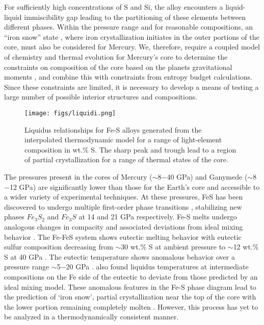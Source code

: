 For sufficiently high concentrations of S and Si, the alloy encounters a
liquid-liquid immiscibility gap leading to the partitioning of these elements between
different phases. Within the pressure range and for reasonable compositions, an “iron
snow” state \citep{Chen2008,Williams2009}, where iron crystallization initiates in
the outer portions of the core, must also be considered for Mercury. We, therefore,
require a coupled model of chemistry and thermal evolution for Mercury's core to
determine the constraints on composition of the core based on the planets
gravitational moments \citep{Smith2012}, and combine this with constraints from
entropy budget calculations.  Since these constraints are limited, it is necessary to
develop a means of testing a large number of possible interior structures and
compositions.

 \begin{figure}[h] %
   \centering
   \texttt{[image: figs/liquidi.png]} 
   \caption{Liquidus relationships for Fe-S alloys generated from the interpolated thermodynamic 
   model for a range of light-element composition in wt.\% S. The sharp peak and trough lead to 
   a region of partial crystallization for a range of thermal states of the core.}
   \label{fig:liquidi}
\end{figure}

The pressures present in the cores of Mercury ($\sim$8$-$40 GPa) and Ganymede
($\sim$8$-$12 GPa) are significantly lower than those for the Earth's core and
accessible to a wider variety of experimental techniques. At these pressures, 
FeS has been discovered to undergo multiple first-order phase transitions
\citep{Fei1997,Fei2000}, stabilizing new phases $Fe_3S_2$ and $Fe_3S$ at 14 and 21 GPa 
respectively. Fe-S melts undergo analogous changes in compacity
\citep{Morard2007} and associated deviations from ideal mixing behavior
\citep{Chen2008}. The Fe-FeS system shows eutectic melting behavior with eutectic
sulfur composition decreasing from $\sim$30 wt.\% S at ambient pressure to $\sim$12 
wt.\% S at 40 GPa \citep{Chudinovskikh2007}. The eutectic temperature shows
anomalous behavior over a pressure range $\sim$5$-$20 GPa \citep{Fei1997,Chen2008}.
\citet{Chen2008} also found liquidus temperatures at intermediate
compositions on the Fe side of the eutectic to deviate from those predicted by
an ideal mixing model. These anomalous features in the Fe-S phase diagram lead
to the prediction of `iron snow', partial crystallization near the top of the
core with the lower portion remaining completely molten \citep{Hauck2006,Chen2008}.
However, this process has yet to be analyzed in a thermodynamically consistent
manner.

